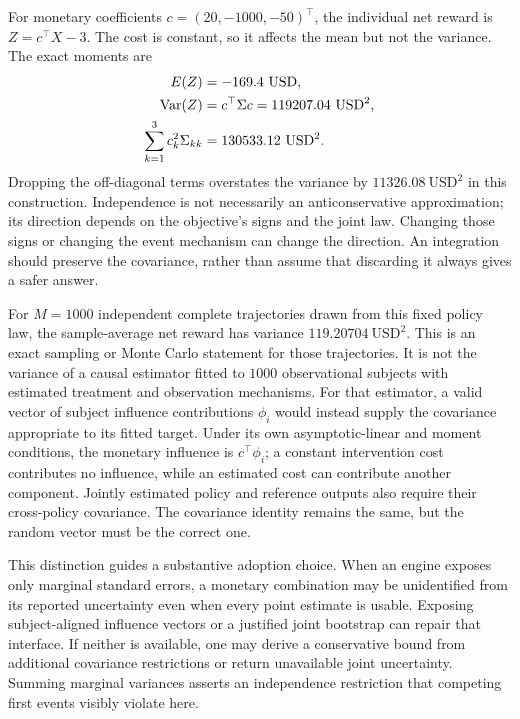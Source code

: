 For monetary coefficients $c=(20,-1000,-50)^\top$, the individual net reward
is $Z=c^\top X-3$. The cost is constant, so it affects the mean but not the
variance. The exact moments are
\begin{align}
 E(Z)&=-169.4\ \mathrm{USD},\notag\\
 \operatorname{Var}(Z)&=c^\top\Sigma c
                 =119207.04\ \mathrm{USD}^2,\notag\\
 \sum_{k=1}^3c_k^2\Sigma_{kk}&=130533.12\ \mathrm{USD}^2.
 \label{exec17:s5-joint-money}
\end{align}
Dropping the off-diagonal terms overstates the variance by
$11326.08\ \mathrm{USD}^2$ in this construction. Independence is not necessarily
an anticonservative approximation; its direction depends on the objective's
signs and the joint law. Changing those signs or changing the event mechanism
can change the direction. An integration should preserve the covariance,
rather than assume that discarding it always gives a safer answer.

For $M=1000$ independent complete trajectories drawn from this fixed policy
law, the sample-average net reward has variance $119.20704\ \mathrm{USD}^2$.
This is an exact sampling or Monte Carlo statement for those trajectories.
It is not the variance of a causal estimator fitted to $1000$ observational
subjects with estimated treatment and observation mechanisms. For that
estimator, a valid vector of subject influence contributions $\phi_i$ would
instead supply the covariance appropriate to its fitted target. Under its
own asymptotic-linear and moment conditions, the monetary influence is
$c^\top\phi_i$; a constant intervention cost contributes no influence, while
an estimated cost can contribute another component. Jointly estimated
policy and reference outputs also require their cross-policy covariance.
The covariance identity remains the same, but the random vector must be the
correct one.~\citep{exec17_s5_joint_error}

This distinction guides a substantive adoption choice. When an engine exposes
only marginal standard errors, a monetary combination may be unidentified
from its reported uncertainty even when every point estimate is usable.
Exposing subject-aligned influence vectors or a justified joint bootstrap
can repair that interface. If neither is available, one may derive a
conservative bound from additional covariance restrictions or return
unavailable joint uncertainty. Summing marginal variances asserts an
independence restriction that competing first events visibly violate here.

